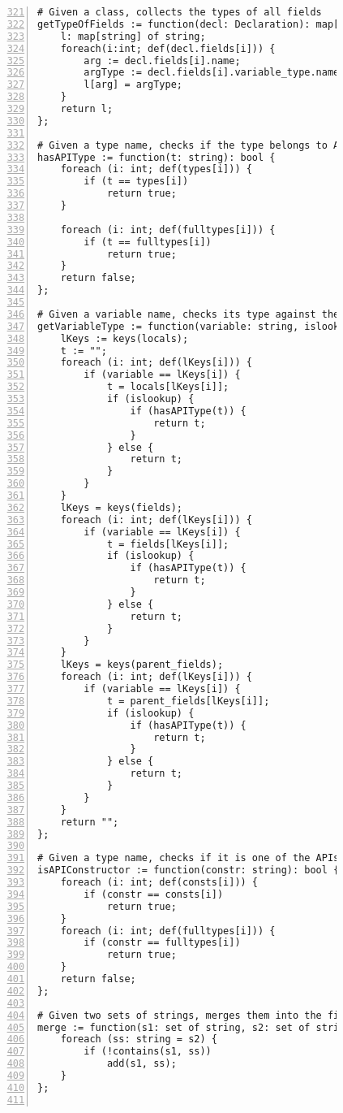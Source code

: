 \begin{figure}[ht!]
\begin{lstlisting}[numbers=left, tabsize=4, escapechar=@, caption={API Usage Mining Analysis},label={lst:aun-code},  firstline = 321, firstnumber = 321, lastline = 381]
# Given a class, collects the types of all fields
getTypeOfFields := function(decl: Declaration): map[string] of string {
    l: map[string] of string;
    foreach(i:int; def(decl.fields[i])) {
        arg := decl.fields[i].name;
        argType := decl.fields[i].variable_type.name;
        l[arg] = argType;
    }
    return l;
};

# Given a type name, checks if the type belongs to APIs of interest
hasAPIType := function(t: string): bool {
    foreach (i: int; def(types[i])) {
        if (t == types[i])
            return true;
    }
    
    foreach (i: int; def(fulltypes[i])) {
        if (t == fulltypes[i])
            return true;
    }
    return false;    
};

# Given a variable name, checks its type against the APIs of interest
getVariableType := function(variable: string, islookup: bool): string {
    lKeys := keys(locals);
    t := "";
    foreach (i: int; def(lKeys[i])) {
        if (variable == lKeys[i]) {
            t = locals[lKeys[i]];
            if (islookup) {
                if (hasAPIType(t)) {
                    return t;
                }
            } else {
                return t;
            }
        }
    }
    lKeys = keys(fields);
    foreach (i: int; def(lKeys[i])) {
        if (variable == lKeys[i]) {
            t = fields[lKeys[i]];
            if (islookup) {
                if (hasAPIType(t)) {
                    return t;
                }
            } else {
                return t;
            }
        }
    }
    lKeys = keys(parent_fields);
    foreach (i: int; def(lKeys[i])) {
        if (variable == lKeys[i]) {
            t = parent_fields[lKeys[i]];
            if (islookup) {
                if (hasAPIType(t)) {
                    return t;
                }
            } else {
                return t;
            }
        }
    }
    return "";
}; 

# Given a type name, checks if it is one of the APIs of interest
isAPIConstructor := function(constr: string): bool {
    foreach (i: int; def(consts[i])) {
        if (constr == consts[i])
            return true;
    }
    foreach (i: int; def(fulltypes[i])) {
        if (constr == fulltypes[i])
            return true;
    }
    return false;
};

# Given two sets of strings, merges them into the first set retaining only unique elements
merge := function(s1: set of string, s2: set of string) {
    foreach (ss: string = s2) {
        if (!contains(s1, ss))
            add(s1, ss);
    }
};


\end{lstlisting}
\end{figure}
